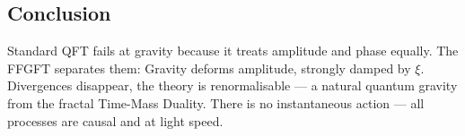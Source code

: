 	\subsection*{Conclusion}
	
	Standard QFT fails at gravity because it treats amplitude and phase equally. The FFGFT separates them: Gravity deforms amplitude, strongly damped by \(\xi\). Divergences disappear, the theory is renormalisable — a natural quantum gravity from the fractal Time-Mass Duality. There is no instantaneous action — all processes are causal and at light speed.



